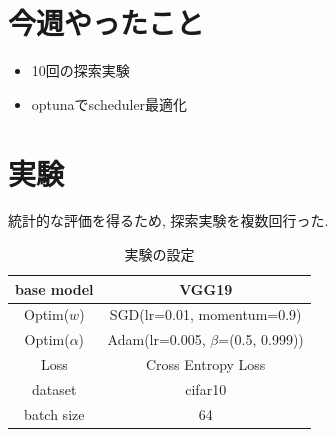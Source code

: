 \documentclass[twocolumn]{jarticle}     %
\begin{document}



\section{今週やったこと}
\begin{itemize}
  \item 10回の探索実験
  \item optunaでscheduler最適化
\end{itemize}

\section{実験}

統計的な評価を得るため, 探索実験を複数回行った.

\begin{table}[tb]
  \begin{center}
    \caption{実験の設定}
    \begin{tabular}{|c|c|} \hline
      base model & VGG19 \\ \hline
      Optim($w$) & SGD(lr=0.01, momentum=0.9) \\ \hline
      Optim($\alpha$) & Adam(lr=0.005, $\beta$=(0.5, 0.999)) \\ \hline
      Loss & Cross Entropy Loss \\ \hline
      dataset & cifar10 \\ \hline
      batch size & 64 \\ \hline
    \end{tabular}
    \label{tab:setting}
  \end{center}
\end{table}
\end{document}
